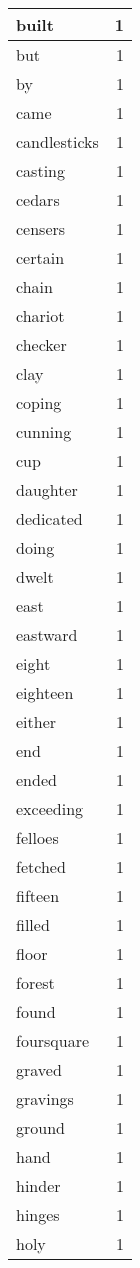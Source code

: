 \begin{center}
\begin{longtable}{l|r}
built & 1 \\ \hline
but & 1 \\ \hline
by & 1 \\ \hline
came & 1 \\ \hline
candlesticks & 1 \\ \hline
casting & 1 \\ \hline
cedars & 1 \\ \hline
censers & 1 \\ \hline
certain & 1 \\ \hline
chain & 1 \\ \hline
chariot & 1 \\ \hline
checker & 1 \\ \hline
clay & 1 \\ \hline
coping & 1 \\ \hline
cunning & 1 \\ \hline
cup & 1 \\ \hline
daughter & 1 \\ \hline
dedicated & 1 \\ \hline
doing & 1 \\ \hline
dwelt & 1 \\ \hline
east & 1 \\ \hline
eastward & 1 \\ \hline
eight & 1 \\ \hline
eighteen & 1 \\ \hline
either & 1 \\ \hline
end & 1 \\ \hline
ended & 1 \\ \hline
exceeding & 1 \\ \hline
felloes & 1 \\ \hline
fetched & 1 \\ \hline
fifteen & 1 \\ \hline
filled & 1 \\ \hline
floor & 1 \\ \hline
forest & 1 \\ \hline
found & 1 \\ \hline
foursquare & 1 \\ \hline
graved & 1 \\ \hline
gravings & 1 \\ \hline
ground & 1 \\ \hline
hand & 1 \\ \hline
hinder & 1 \\ \hline
hinges & 1 \\ \hline
holy & 1 \\ \hline

\end{longtable}
\end{center}
